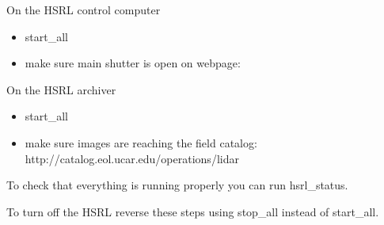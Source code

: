\documentclass[a4paper,12pt]{report}
\begin{document}
\noindent On the HSRL control computer

\begin{itemize}

\item start\_all

\item make sure main shutter is open on webpage: 

\end{itemize}

\noindent On the HSRL archiver

\begin{itemize}

\item start\_all

\item make sure images are reaching the field catalog: http://catalog.eol.ucar.edu/operations/lidar

\end{itemize}



\noindent To check that everything is running properly you can run hsrl\_status. 

\noindent To turn off the HSRL reverse these steps using stop\_all instead of start\_all. 
\end{document}
